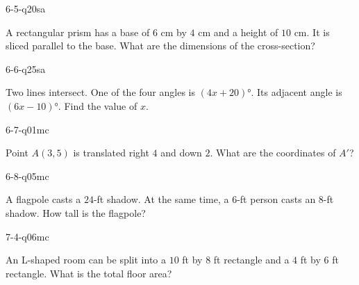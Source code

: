\begin{practiceQuestion}{6-5-q20}{sa}
\begin{questionText}
A rectangular prism has a base of $6$ cm by $4$ cm and a height of $10$ cm. It is sliced parallel to the base. What are the dimensions of the cross-section?
\end{questionText}
\end{practiceQuestion}

\begin{practiceQuestion}{6-6-q25}{sa}
\begin{questionText}
Two lines intersect. One of the four angles is $(4x + 20)°$. Its adjacent angle is $(6x - 10)°$. Find the value of $x$.
\end{questionText}
\end{practiceQuestion}

\begin{practiceQuestion}{6-7-q01}{mc}
\begin{questionText}
Point $A(3, 5)$ is translated right $4$ and down $2$. What are the coordinates of $A'$?
\end{questionText}
\end{practiceQuestion}

\begin{practiceQuestion}{6-8-q05}{mc}
\begin{questionText}
A flagpole casts a $24$-ft shadow. At the same time, a $6$-ft person casts an $8$-ft shadow. How tall is the flagpole?
\end{questionText}
\end{practiceQuestion}

\begin{practiceQuestion}{7-4-q06}{mc}
\begin{questionText}
An L-shaped room can be split into a $10$ ft by $8$ ft rectangle and a $4$ ft by $6$ ft rectangle. What is the total floor area?
\end{questionText}
\end{practiceQuestion}

